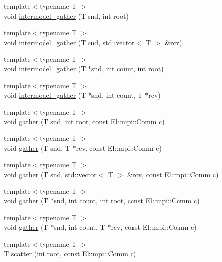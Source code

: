 \begin{DoxyCompactItemize}
\item 
{\footnotesize template$<$typename T $>$ }\\void \hyperlink{classlbann_1_1lbann__comm_a142c396a4d4a2c16ee234b813e7e45a6}{intermodel\+\_\+gather} (T snd, int root)
\item 
{\footnotesize template$<$typename T $>$ }\\void \hyperlink{classlbann_1_1lbann__comm_aafaadde82ce60f467b5dcf014dc78481}{intermodel\+\_\+gather} (T snd, std\+::vector$<$ T $>$ \&rcv)
\item 
{\footnotesize template$<$typename T $>$ }\\void \hyperlink{classlbann_1_1lbann__comm_a3fe4457945fb78769a69ac7f86e4bc11}{intermodel\+\_\+gather} (T $\ast$snd, int count, int root)
\item 
{\footnotesize template$<$typename T $>$ }\\void \hyperlink{classlbann_1_1lbann__comm_a954d59f6574884b9a6c7d5228e9460d4}{intermodel\+\_\+gather} (T $\ast$snd, int count, T $\ast$rcv)
\item 
{\footnotesize template$<$typename T $>$ }\\void \hyperlink{classlbann_1_1lbann__comm_aa784298e6ed0f9f01a20b179d5110df9}{gather} (T snd, int root, const El\+::mpi\+::\+Comm c)
\item 
{\footnotesize template$<$typename T $>$ }\\void \hyperlink{classlbann_1_1lbann__comm_ae4b572b9b6538ab148b3082f54514c19}{gather} (T snd, T $\ast$rcv, const El\+::mpi\+::\+Comm c)
\item 
{\footnotesize template$<$typename T $>$ }\\void \hyperlink{classlbann_1_1lbann__comm_a46a70202481a0b8bc5770f7174d8462f}{gather} (T snd, std\+::vector$<$ T $>$ \&rcv, const El\+::mpi\+::\+Comm c)
\item 
{\footnotesize template$<$typename T $>$ }\\void \hyperlink{classlbann_1_1lbann__comm_a6d9e9a16e30045690ea416bf25b77148}{gather} (T $\ast$snd, int count, int root, const El\+::mpi\+::\+Comm c)
\item 
{\footnotesize template$<$typename T $>$ }\\void \hyperlink{classlbann_1_1lbann__comm_a90680b777bcecb4d24392b3300919066}{gather} (T $\ast$snd, int count, T $\ast$rcv, const El\+::mpi\+::\+Comm c)
\item 
{\footnotesize template$<$typename T $>$ }\\T \hyperlink{classlbann_1_1lbann__comm_a74b5c594bfa5aec03af9ad2bd8f5e979}{scatter} (int root, const El\+::mpi\+::\+Comm c)

\end{DoxyCompactItemize}
